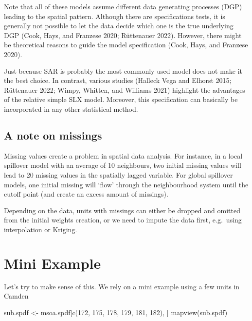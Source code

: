 \documentclass[
  letterpaper,
  DIV=11,
  numbers=noendperiod]{scrreprt}
\newenvironment{Shaded}{\begin{snugshade}}{\end{snugshade}}
\newcommand{\DecValTok}[1]{\textcolor[rgb]{0.68,0.00,0.00}{#1}}
\newcommand{\FunctionTok}[1]{\textcolor[rgb]{0.28,0.35,0.67}{#1}}
\newcommand{\NormalTok}[1]{\textcolor[rgb]{0.00,0.23,0.31}{#1}}
\newcommand{\OtherTok}[1]{\textcolor[rgb]{0.00,0.23,0.31}{#1}}
\begin{document}
Note that all of these models assume different data generating processes
(DGP) leading to the spatial pattern. Although there are specifications
tests, it is generally not possible to let the data decide which one is
the true underlying DGP (Cook, Hays, and Franzese 2020; Rüttenauer
2022). However, there might be theoretical reasons to guide the model
specification (Cook, Hays, and Franzese 2020).

Just because SAR is probably the most commonly used model does not make
it the best choice. In contrast, various studies (Halleck Vega and
Elhorst 2015; Rüttenauer 2022; Wimpy, Whitten, and Williams 2021)
highlight the advantages of the relative simple SLX model. Moreover,
this specification can basically be incorporated in any other
statistical method.

\hypertarget{a-note-on-missings}{%
\subsection{A note on missings}\label{a-note-on-missings}}

Missing values create a problem in spatial data analysis. For instance,
in a local spillover model with an average of 10 neighbours, two initial
missing values will lead to 20 missing values in the spatially lagged
variable. For global spillover models, one initial missing will `flow'
through the neighbourhood system until the cutoff point (and create an
excess amount of missings).

Depending on the data, units with missings can either be dropped and
omitted from the initial weights creation, or we need to impute the data
first, e.g.~using interpolation or Kriging.

\hypertarget{mini-example}{%
\section{Mini Example}\label{mini-example}}

Let's try to make sense of this. We rely on a mini example using a few
units in Camden

\begin{Shaded}
\begin{Highlighting}[]
\NormalTok{sub.spdf }\OtherTok{\textless{}{-}}\NormalTok{ msoa.spdf[}\FunctionTok{c}\NormalTok{(}\DecValTok{172}\NormalTok{, }\DecValTok{175}\NormalTok{, }\DecValTok{178}\NormalTok{, }\DecValTok{179}\NormalTok{, }\DecValTok{181}\NormalTok{, }\DecValTok{182}\NormalTok{), ]}
\FunctionTok{mapview}\NormalTok{(sub.spdf)}
\end{Highlighting}
\end{Shaded}
\end{document}
